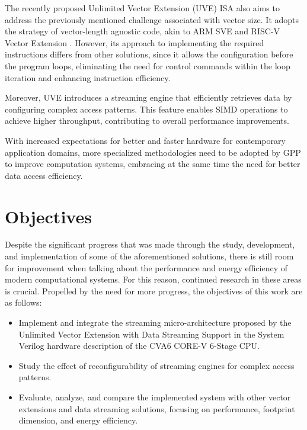 The recently proposed Unlimited Vector Extension (UVE) \cite{uve-paper} \acrfull{ISA} also aims to address the previously mentioned challenge associated with vector size. It adopts the strategy of vector-length agnostic code, akin to ARM SVE \cite{arm-paper} and RISC-V Vector Extension \cite{RVV}. However, its approach to implementing the required instructions differs from other solutions, since it allows the configuration before the program loops, eliminating the need for control commands within the loop iteration and enhancing instruction efficiency.

Moreover, UVE introduces a streaming engine that efficiently retrieves data by configuring complex access patterns. This feature enables \acrshort{SIMD} operations to achieve higher throughput, contributing to overall performance improvements.

With increased expectations for better and faster hardware for contemporary application domains, more specialized methodologies need to be adopted by \acrfull{GPP} to improve computation systems, embracing at the same time the need for better data access efficiency.


\section{Objectives}

Despite the significant progress that was made through the study, development, and implementation of some of the aforementioned solutions, there is still room for improvement when talking about the performance and energy efficiency of modern computational systems. For this reason, continued research in these areas is crucial. 
Propelled by the need for more progress, the objectives of this work are as follows:
\begin{itemize}
    \item Implement and integrate the streaming micro-architecture proposed by the Unlimited Vector Extension with Data Streaming Support in the System Verilog hardware description of the CVA6 CORE-V 6-Stage CPU. 
    \item Study the effect of reconfigurability of streaming engines for complex access patterns.
    \item Evaluate, analyze, and compare the implemented system with other vector extensions and data streaming solutions, focusing on performance, footprint dimension, and energy efficiency.
\end{itemize}

